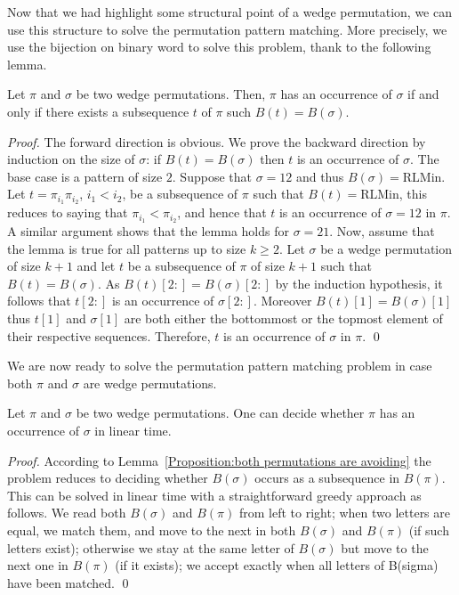 \documentclass[a4paper]{llncs}
\newcommand{\RLMin}{\text{RLMin}}
\newcommand{\bijection}{B}
\begin{document}
Now that we had highlight some structural point of a wedge permutation,
we can use this structure to solve the permutation pattern matching.
More precisely, we use the bijection on binary word to solve this problem,
thank to the following lemma.

\begin{lemma}
\label{lemma:MatchStripeToPermutation}
Let $\pi$ and $\sigma$ be two wedge permutations.
Then, $\pi$ has an occurrence of $\sigma$ if and only if
there exists a subsequence $t$ of $\pi$ such $\bijection(t)=\bijection(\sigma)$.
\end{lemma}

\begin{proof} %
The forward direction is obvious.
We prove the backward direction by induction on the size of
$\sigma$: if $\bijection(t)=\bijection(\sigma)$ then $t$ is an occurrence of $\sigma$.
The base case is a pattern of size $2$.
Suppose that $\sigma = 12$ and thus $\bijection(\sigma) = \RLMin$.
Let $t = \pi_{i_1}\pi_{i_2}$, $i_1 < i_2$, be a subsequence of $\pi$
such that $\bijection(t) = \RLMin$, this reduces to saying that
$\pi_{i_1} < \pi_{i_2}$,
and hence that $t$ is an occurrence of $\sigma = 12$ in $\pi$.
A similar argument shows that the lemma holds for $\sigma = 21$.
Now, assume that the lemma is true for all patterns up to size $k \geq 2$.
Let $\sigma$ be a wedge permutation of size $k+1$ and
let $t$
be a subsequence of $\pi$ of size $k+1$ such that
$\bijection(t) = \bijection(\sigma)$.
As $\bijection(t)[2:] = \bijection(\sigma)[2:]$
by the induction hypothesis, it follows that
$t[2:]$ is an occurrence of $\sigma[2:]$.
Moreover $\bijection(t)[1] = \bijection(\sigma)[1]$
thus $t[1]$ and $\sigma[1]$ are both either the bottommost or the topmost
element of their respective sequences.
Therefore, $t$ is an occurrence of $\sigma$ in $\pi$.
\qed
\end{proof}

We are now ready to solve the permutation pattern matching problem in case
both $\pi$ and $\sigma$ are wedge permutations.

\begin{proposition}
\label{Proposition:both permutations are avoiding}
Let $\pi$ and $\sigma$ be two wedge permutations.
One can decide whether $\pi$ has an occurrence of $\sigma$ in linear time.
\end{proposition}

\begin{proof}
According to Lemma~\ref{Proposition:both permutations are avoiding} the problem reduces
to deciding whether $\bijection(\sigma)$ occurs as a subsequence in $\bijection(\pi)$.
This can be solved in linear time with a straightforward greedy approach as follows.
We read both $\bijection(\sigma)$ and $\bijection(\pi)$ from left to right;
when two letters are equal, we match them, and move to the next in both
$\bijection(\sigma)$ and $\bijection(\pi)$ (if such letters exist);
otherwise we stay at the same letter of $\bijection(\sigma)$
but move to the next one in $\bijection(\pi)$ (if it exists);
we accept exactly when all letters of B(sigma) have been matched.
\qed
\end{proof}
\end{document}
